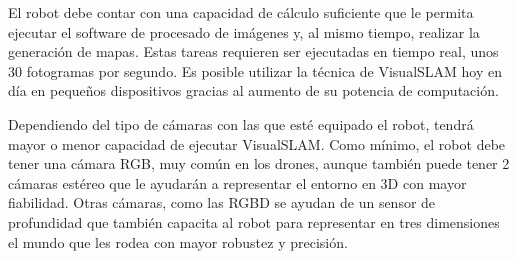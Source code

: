 El robot debe contar con una capacidad de cálculo suficiente que le permita ejecutar el software de procesado de imágenes y, al mismo tiempo, realizar la generación de mapas. Estas tareas requieren ser ejecutadas en tiempo real, unos 30 fotogramas por segundo. Es posible utilizar la técnica de VisualSLAM hoy en día en pequeños dispositivos gracias al aumento de su potencia de computación.

Dependiendo del tipo de cámaras con las que esté equipado  el robot,  tendrá mayor o menor capacidad de ejecutar VisualSLAM. Como mínimo, el robot debe tener una cámara RGB, muy común en los drones, aunque también puede tener 2 cámaras estéreo que le ayudarán a representar el entorno en 3D con mayor fiabilidad. Otras cámaras,  como las RGBD se ayudan de un sensor de profundidad que también capacita al robot para representar en tres dimensiones el mundo que les rodea con mayor robustez y precisión.

